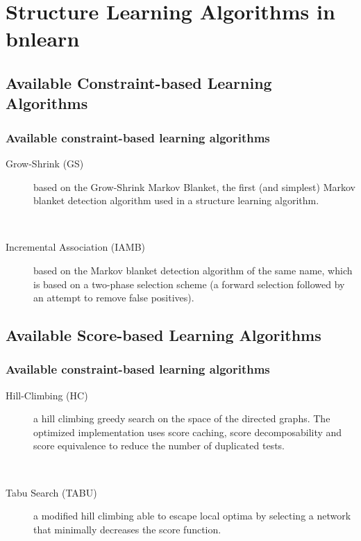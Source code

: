 \documentclass{beamer}
\begin{document}
\section{Structure Learning Algorithms in bnlearn}
\subsection{Available Constraint-based Learning Algorithms}
\begin{frame}
\frametitle{Available constraint-based learning algorithms}
{\scriptsize{}
\begin{description}
\item[Grow-Shrink (GS)] based on the Grow-Shrink Markov Blanket, the first (and simplest) Markov blanket detection algorithm used in a structure learning algorithm.

{}\

\item[Incremental Association (IAMB)] based on the Markov blanket detection algorithm of the same name, which is based on a two-phase selection scheme (a forward selection followed by an attempt to remove false positives).
\end{description}
}
\end{frame}


\subsection{Available Score-based Learning Algorithms}
\begin{frame}
\frametitle{Available constraint-based learning algorithms}
{\scriptsize{}
\begin{description}
\item[Hill-Climbing (HC)] a hill climbing greedy search on the space of the directed graphs. The optimized implementation uses score caching, score decomposability and score equivalence to reduce the number of duplicated tests.

{}\

\item[Tabu Search (TABU)] a modified hill climbing able to escape local optima by selecting a network that minimally decreases the score function.
\end{description}
}
\end{frame}
\end{document}
